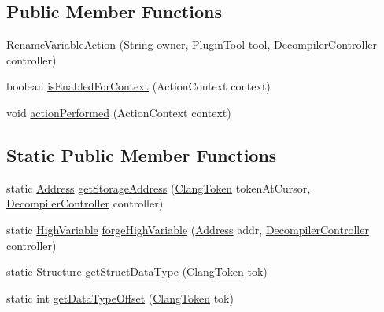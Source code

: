 \subsection*{Public Member Functions}
\begin{DoxyCompactItemize}
\item 
\mbox{\hyperlink{classghidra_1_1app_1_1plugin_1_1core_1_1decompile_1_1actions_1_1_rename_variable_action_a1fbd157581eb9916336005059d6a6d14}{Rename\+Variable\+Action}} (String owner, Plugin\+Tool tool, \mbox{\hyperlink{classghidra_1_1app_1_1decompiler_1_1component_1_1_decompiler_controller}{Decompiler\+Controller}} controller)
\item 
boolean \mbox{\hyperlink{classghidra_1_1app_1_1plugin_1_1core_1_1decompile_1_1actions_1_1_rename_variable_action_a823658f79732c41f5c7e6951d95df83b}{is\+Enabled\+For\+Context}} (Action\+Context context)
\item 
void \mbox{\hyperlink{classghidra_1_1app_1_1plugin_1_1core_1_1decompile_1_1actions_1_1_rename_variable_action_aef0ab1f6e8e814f10bb63e343f095d37}{action\+Performed}} (Action\+Context context)
\end{DoxyCompactItemize}
\subsection*{Static Public Member Functions}
\begin{DoxyCompactItemize}
\item 
static \mbox{\hyperlink{class_address}{Address}} \mbox{\hyperlink{classghidra_1_1app_1_1plugin_1_1core_1_1decompile_1_1actions_1_1_rename_variable_action_a53116a7c562ce55a51d92040128854aa}{get\+Storage\+Address}} (\mbox{\hyperlink{classghidra_1_1app_1_1decompiler_1_1_clang_token}{Clang\+Token}} token\+At\+Cursor, \mbox{\hyperlink{classghidra_1_1app_1_1decompiler_1_1component_1_1_decompiler_controller}{Decompiler\+Controller}} controller)
\item 
static \mbox{\hyperlink{class_high_variable}{High\+Variable}} \mbox{\hyperlink{classghidra_1_1app_1_1plugin_1_1core_1_1decompile_1_1actions_1_1_rename_variable_action_a417ef24d8f7262d693795f45d87ddcf1}{forge\+High\+Variable}} (\mbox{\hyperlink{class_address}{Address}} addr, \mbox{\hyperlink{classghidra_1_1app_1_1decompiler_1_1component_1_1_decompiler_controller}{Decompiler\+Controller}} controller)
\item 
static Structure \mbox{\hyperlink{classghidra_1_1app_1_1plugin_1_1core_1_1decompile_1_1actions_1_1_rename_variable_action_aae5f9e84106ddcf6bd573595dd9b219f}{get\+Struct\+Data\+Type}} (\mbox{\hyperlink{classghidra_1_1app_1_1decompiler_1_1_clang_token}{Clang\+Token}} tok)
\item 
static int \mbox{\hyperlink{classghidra_1_1app_1_1plugin_1_1core_1_1decompile_1_1actions_1_1_rename_variable_action_ac5eedef3e8e52cd9cfa2650f76341f55}{get\+Data\+Type\+Offset}} (\mbox{\hyperlink{classghidra_1_1app_1_1decompiler_1_1_clang_token}{Clang\+Token}} tok)
\end{DoxyCompactItemize}


